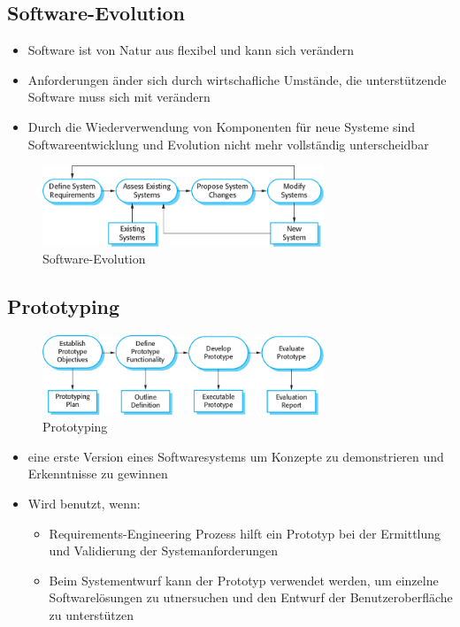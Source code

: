\subsection{Software-Evolution}
\begin{itemize}
    \item Software ist von Natur aus flexibel und kann sich verändern
    \item Anforderungen änder sich durch wirtschafliche Umstände, die unterstützende Software muss sich mit verändern
    \item Durch die Wiederverwendung von Komponenten für neue Systeme sind Softwareentwicklung und Evolution nicht mehr vollständig unterscheidbar
\end{itemize}
\begin{figure}
    \centering
    \includegraphics[width=0.75\textwidth]{mainmatter/pics/evolution.png}
    \caption{Software-Evolution}
\end{figure}

\subsection{Prototyping}
\begin{figure}
    \centering
    \includegraphics[width=0.75\textwidth]{mainmatter/pics/prototyping.png}
    \caption{Prototyping}
\end{figure}
\begin{itemize}
    \item eine erste Version eines Softwaresystems um Konzepte zu demonstrieren und Erkenntnisse zu gewinnen
    \item Wird benutzt, wenn:
    \begin{itemize}
        \item Requirements-Engineering Prozess hilft ein Prototyp bei der Ermittlung und Validierung der Systemanforderungen
        \item Beim Systementwurf kann der Prototyp verwendet werden, um einzelne Softwarelösungen zu utnersuchen und den Entwurf der Benutzeroberfläche zu unterstützen 
    \end{itemize}
\end{itemize}


